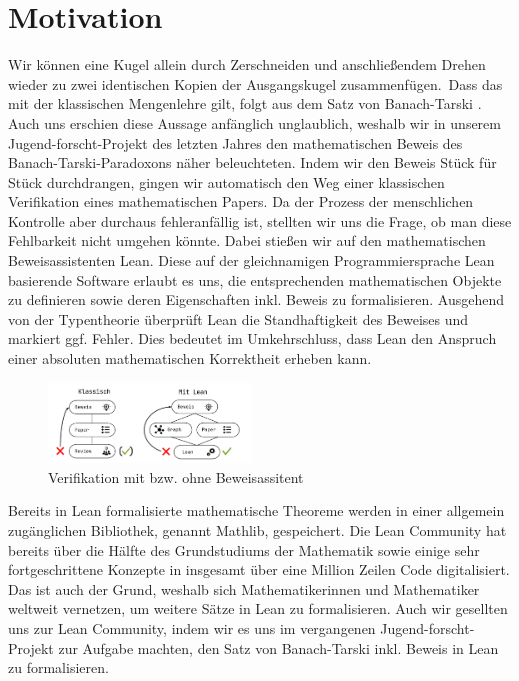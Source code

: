 \documentclass{article}
\begin{document}
\clearpage
\setcounter{page}{1}


\section{Motivation}
\glqq Wir können eine Kugel allein durch Zerschneiden und anschließendem Drehen wieder zu zwei identischen Kopien der Ausgangskugel zusammenfügen.\grqq~Dass das mit der klassischen Mengenlehre gilt, folgt aus dem Satz von Banach-Tarski \autocite{noauthor_banach-tarski-paradoxon_2024}. Auch uns erschien diese Aussage anfänglich unglaublich, weshalb wir in unserem Jugend-forscht-Projekt des letzten Jahres den mathematischen Beweis des Banach-Tarski-Paradoxons näher beleuchteten. Indem wir den Beweis Stück für Stück durchdrangen, gingen wir automatisch den Weg einer klassischen Verifikation eines mathematischen Papers. Da der Prozess der menschlichen Kontrolle aber durchaus fehleranfällig ist, stellten wir uns die Frage, ob man diese Fehlbarkeit nicht umgehen könnte. Dabei stießen wir auf den mathematischen Beweisassistenten Lean. Diese auf der gleichnamigen Programmiersprache Lean basierende Software erlaubt es uns, die entsprechenden mathematischen Objekte zu definieren sowie deren Eigenschaften inkl. Beweis zu formalisieren. Ausgehend von der Typentheorie überprüft Lean die Standhaftigkeit des Beweises und markiert ggf. Fehler. Dies bedeutet im Umkehrschluss, dass Lean den Anspruch einer absoluten mathematischen Korrektheit erheben kann.\\
\begin{figure}
  \begin{center}
    \includegraphics[width=0.48\textwidth]{Formalisierung_Grafik.png}
  \end{center}
  \caption{Verifikation mit bzw. ohne Beweisassitent}
\end{figure}
\noindent Bereits in Lean formalisierte mathematische Theoreme werden in einer allgemein zugänglichen Bibliothek, genannt Mathlib, gespeichert. Die Lean Community hat bereits über die Hälfte des Grundstudiums der Mathematik sowie einige sehr fortgeschrittene Konzepte in insgesamt über eine Million Zeilen Code digitalisiert. Das ist auch der Grund, weshalb sich Mathematikerinnen und Mathematiker weltweit vernetzen, um weitere Sätze in Lean zu formalisieren. Auch wir gesellten uns zur Lean Community, indem wir es uns im vergangenen Jugend-forscht-Projekt zur Aufgabe machten, den Satz von Banach-Tarski inkl. Beweis in Lean zu formalisieren.\\
\end{document}
